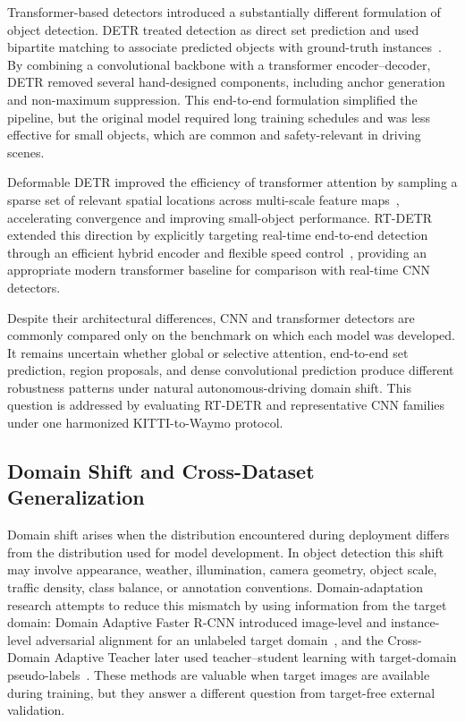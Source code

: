 Transformer-based detectors introduced a substantially different formulation of object
detection. DETR treated detection as direct set prediction and used bipartite matching to
associate predicted objects with ground-truth instances~\cite{carion2020detr}. By
combining a convolutional backbone with a transformer encoder--decoder, DETR removed
several hand-designed components, including anchor generation and non-maximum suppression.
This end-to-end formulation simplified the pipeline, but the original model required long
training schedules and was less effective for small objects, which are common and
safety-relevant in driving scenes.

Deformable DETR improved the efficiency of transformer attention by sampling a sparse set
of relevant spatial locations across multi-scale feature maps~\cite{zhu2021deformabledetr},
accelerating convergence and improving small-object performance. RT-DETR extended this
direction by explicitly targeting real-time end-to-end detection through an efficient
hybrid encoder and flexible speed control~\cite{zhao2024rtdetr}, providing an appropriate
modern transformer baseline for comparison with real-time CNN detectors.

Despite their architectural differences, CNN and transformer detectors are commonly
compared only on the benchmark on which each model was developed. It remains uncertain
whether global or selective attention, end-to-end set prediction, region proposals, and
dense convolutional prediction produce different robustness patterns under natural
autonomous-driving domain shift. This question is addressed by evaluating RT-DETR and
representative CNN families under one harmonized KITTI-to-Waymo protocol.

\subsection{Domain Shift and Cross-Dataset Generalization}
\label{sec:related_domain_shift}

Domain shift arises when the distribution encountered during deployment differs from the
distribution used for model development. In object detection this shift may involve
appearance, weather, illumination, camera geometry, object scale, traffic density, class
balance, or annotation conventions. Domain-adaptation research attempts to reduce this
mismatch by using information from the target domain: Domain Adaptive Faster R-CNN
introduced image-level and instance-level adversarial alignment for an unlabeled target
domain~\cite{chen2018domainadaptive}, and the Cross-Domain Adaptive Teacher later used
teacher--student learning with target-domain pseudo-labels~\cite{li2022crossdomainadaptive}.
These methods are valuable when target images are available during training, but they
answer a different question from target-free external validation.

